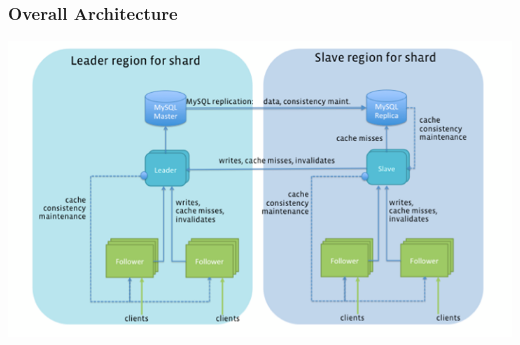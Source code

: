 \begin{frame}[c]\frametitle{Overall Architecture}
    \begin{center}
    	\includegraphics[width=\textwidth]{figs/tao_geo.png}
    \end{center}


\end{frame}

